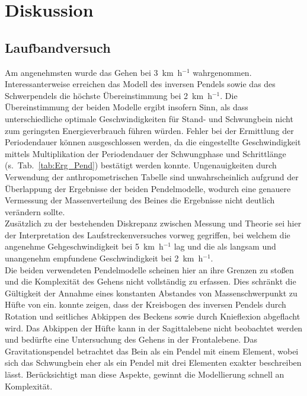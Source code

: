 \section{Diskussion}
\subsection{Laufbandversuch}
Am angenehmsten wurde das Gehen bei 3~km~h$^{-1}$ wahrgenommen. Interessanterweise erreichen das Modell des inversen Pendels sowie das des Schwerpendels die höchste Übereinstimmung bei 2~km~h$^{-1}$. Die Übereinstimmung der beiden Modelle ergibt insofern Sinn, als dass unterschiedliche optimale Geschwindigkeiten für Stand- und Schwungbein nicht zum geringsten Energieverbrauch führen würden. Fehler bei der Ermittlung der Periodendauer können ausgeschlossen werden, da die eingestellte Geschwindigkeit mittels Multiplikation der Periodendauer der Schwungphase und Schrittlänge (s.~Tab.~\ref{tab:Erg_Pend}) bestätigt werden konnte. 
Ungenauigkeiten durch Verwendung der anthropometrischen Tabelle sind unwahrscheinlich aufgrund der Überlappung der Ergebnisse der beiden Pendelmodelle, wodurch eine genauere Vermessung der Massenverteilung des Beines die Ergebnisse nicht deutlich verändern sollte.\\
Zusätzlich zu der bestehenden Diskrepanz zwischen Messung und Theorie sei hier der Interpretation des Laufstreckenversuches vorweg gegriffen, bei welchem die angenehme Gehgeschwindigkeit bei 5~km~h$^{-1}$ lag und die als langsam und unangenehm empfundene Geschwindigkeit bei 2~km~h$^{-1}$.\\
Die beiden verwendeten Pendelmodelle scheinen hier an ihre Grenzen zu stoßen und die Komplexität des Gehens nicht vollständig zu erfassen. Dies schränkt die Gültigkeit der Annahme eines konstanten Abstandes von Massenschwerpunkt zu Hüfte von \textcite{witte1992mechanische} ein. \textcite{mcmahon1984muscles} konnte zeigen, dass der Kreisbogen des inversen Pendels durch Rotation und seitliches Abkippen des Beckens sowie durch Knieflexion abgeflacht wird. Das Abkippen der Hüfte kann in der Sagittalebene nicht beobachtet werden und bedürfte eine Untersuchung des Gehens in der Frontalebene. Das Gravitationspendel betrachtet das Bein als ein Pendel mit einem Element, wobei sich das Schwungbein eher als ein Pendel mit drei Elementen exakter beschreiben lässt. Berücksichtigt man diese Aspekte, gewinnt die Modellierung schnell an Komplexität.\\
